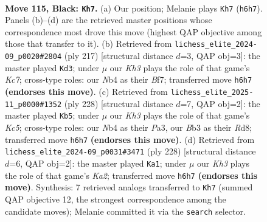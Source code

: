 \documentclass[11pt]{article}
\begin{document}
\clearpage

\begin{figure}[p]\centering
\begin{subfigure}{0.46\textwidth}\centering
\resizebox{\linewidth}{!}{%
\newchessgame
\chessboard[
  setfen={8/8/7k/8/1n1B3K/1b6/5P2/8 b - - 76 115},
  showmover=false,
  pgfstyle=straightmove, color=movearrow, markmove={h6-h7}
]}
\caption{}
\end{subfigure}\hfill
\begin{subfigure}{0.46\textwidth}\centering
\resizebox{\linewidth}{!}{%
\newchessgame
\chessboard[
  setfen={8/5b2/5P2/8/1K1B4/8/2k5/8 b - - 32 109},
  showmover=false,
  pgfstyle=straightmove, color=movearrow, markmove={c2-d3}
]}
\caption{}
\end{subfigure}
\\[4pt]
\begin{subfigure}{0.46\textwidth}\centering
\resizebox{\linewidth}{!}{%
\newchessgame
\chessboard[
  setfen={3R4/1k6/8/2K5/p7/P7/2b5/8 w - - 31 115},
  showmover=false,
  pgfstyle=straightmove, color=movearrow, markmove={c5-b5}
]}
\caption{}
\end{subfigure}\hfill
\begin{subfigure}{0.46\textwidth}\centering
\resizebox{\linewidth}{!}{%
\newchessgame
\chessboard[
  setfen={8/8/p7/8/1k6/3b4/K7/8 w - - 40 115},
  showmover=false,
  pgfstyle=straightmove, color=movearrow, markmove={a2-a1}
]}
\caption{}
\end{subfigure}
\caption{\textbf{Move 115, Black: \texttt{Kh7}.} (a) Our position; Melanie plays \texttt{Kh7} (\texttt{h6h7}). Panels (b)--(d) are the retrieved master positions whose correspondence most drove this move (highest QAP objective among those that transfer to it). (b) Retrieved from \texttt{lichess\_elite\_2024-09\_p0020\#2804} (ply 217) [structural distance $d$=3, QAP obj=3]: the master played \texttt{Kd3}; under $\mu$ our \emph{Kh3} plays the role of that game's \emph{Kc7}; cross-type roles: our \emph{N}b4 as their \emph{B}f7; transferred move \texttt{h6h7} \textbf{(endorses this move)}. (c) Retrieved from \texttt{lichess\_elite\_2025-11\_p0000\#1352} (ply 228) [structural distance $d$=7, QAP obj=2]: the master played \texttt{Kb5}; under $\mu$ our \emph{Kh3} plays the role of that game's \emph{Kc5}; cross-type roles: our \emph{N}b4 as their \emph{P}a3, our \emph{B}b3 as their \emph{R}d8; transferred move \texttt{h6h7} \textbf{(endorses this move)}. (d) Retrieved from \texttt{lichess\_elite\_2024-09\_p0031\#3471} (ply 228) [structural distance $d$=6, QAP obj=2]: the master played \texttt{Ka1}; under $\mu$ our \emph{Kh3} plays the role of that game's \emph{Ka2}; transferred move \texttt{h6h7} \textbf{(endorses this move)}. Synthesis: 7 retrieved analogs transferred to \texttt{Kh7} (summed QAP objective 12, the strongest correspondence among the candidate moves); Melanie committed it via the \texttt{search} selector.}
\label{fig:thought-m229}
\end{figure}
\end{document}
